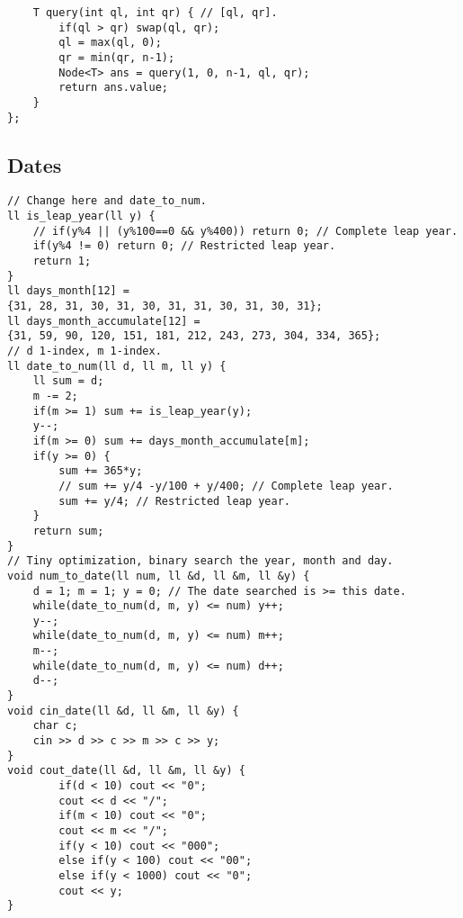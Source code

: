 \documentclass[a4paper]{article}
\begin{document}
\begin{multicols}{2}
\begin{verbatim}
    T query(int ql, int qr) { // [ql, qr].
        if(ql > qr) swap(ql, qr);
        ql = max(ql, 0);
        qr = min(qr, n-1);
        Node<T> ans = query(1, 0, n-1, ql, qr);
        return ans.value;
    }
};
\end{verbatim}
\end{multicols}
\subsection*{Dates}
\begin{multicols}{2}
\begin{verbatim}
// Change here and date_to_num.
ll is_leap_year(ll y) {
    // if(y%4 || (y%100==0 && y%400)) return 0; // Complete leap year.
    if(y%4 != 0) return 0; // Restricted leap year.
    return 1;
}
ll days_month[12] = 
{31, 28, 31, 30, 31, 30, 31, 31, 30, 31, 30, 31};
ll days_month_accumulate[12] = 
{31, 59, 90, 120, 151, 181, 212, 243, 273, 304, 334, 365};
// d 1-index, m 1-index.
ll date_to_num(ll d, ll m, ll y) {
    ll sum = d;
    m -= 2;
    if(m >= 1) sum += is_leap_year(y);
    y--;
    if(m >= 0) sum += days_month_accumulate[m];
    if(y >= 0) {
        sum += 365*y;
        // sum += y/4 -y/100 + y/400; // Complete leap year.
        sum += y/4; // Restricted leap year.
    } 
    return sum;
}
// Tiny optimization, binary search the year, month and day.
void num_to_date(ll num, ll &d, ll &m, ll &y) {
    d = 1; m = 1; y = 0; // The date searched is >= this date.
    while(date_to_num(d, m, y) <= num) y++;
    y--;
    while(date_to_num(d, m, y) <= num) m++;
    m--;
    while(date_to_num(d, m, y) <= num) d++;
    d--;
}
void cin_date(ll &d, ll &m, ll &y) {
    char c;
    cin >> d >> c >> m >> c >> y;
}
void cout_date(ll &d, ll &m, ll &y) {
        if(d < 10) cout << "0";
        cout << d << "/";
        if(m < 10) cout << "0";
        cout << m << "/";
        if(y < 10) cout << "000";
        else if(y < 100) cout << "00";
        else if(y < 1000) cout << "0";
        cout << y;
}
\end{verbatim}
\end{multicols}
\end{document}
